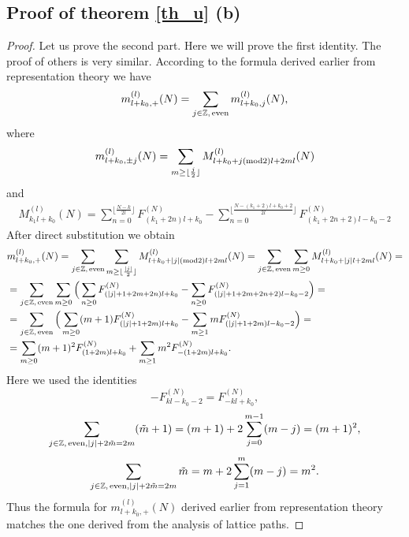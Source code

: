 \documentclass[11pt]{amsart}
\begin{document}
\subsection{Proof of theorem \ref{th_u} (b)}
\begin{proof}
Let us prove the second part. Here we will prove the first identity. 
The proof of others is very similar. According to the formula derived earlier 
from representation theory we have 
\begin{equation*}
m^{(l)}_{l+k_0,+}(N)  = \sum_{j \in \mathbb{Z},\, {\rm even} } m^{(l)}_{l+k_0,j}(N),
\end{equation*}
where
\begin{equation*}
m^{(l)}_{l+k_0,\pm j}(N)  = \sum_{m \geq \lfloor \frac{j}{2} \rfloor} M^{(l)}_{l+k_0+ j({\rm mod}2)l + 2ml}(N)
\end{equation*}
and
\begin{eqnarray*}
M_{k_1 l +k_0}^{(l)}(N) =   
\sum\limits_{n=0}^{\lfloor\frac{N-k}{2l}\rfloor  } F_{(k_1+2n)l + k_0}^{(N)}- \sum\limits_{n=0}^{\lfloor\frac{N-(k_1+ 2)l +k_0+2}{2l}\rfloor} F_{(k_1+2n +2)l -k_0-2}^{(N)}
\end{eqnarray*}
After direct substitution we obtain
\begin{eqnarray*}
&m^{(l)}_{l+k_0,+}(N)=\sum\limits_{j \in \mathbb{Z},\, {\rm even} } \sum\limits_{m \geq \lfloor \frac{|j|}{2} \rfloor} M^{(l)}_{l+k_0+ |j|({\rm mod}2)l + 2ml}(N)=\sum\limits_{j \in \mathbb{Z},\, {\rm even} } \sum\limits_{m \geq 0} M^{(l)}_{l+k_0+|j|l+2ml}(N)=\\
&=\sum\limits_{j \in \mathbb{Z},\, {\rm even} } \sum\limits_{m \geq 0}\Big(\sum\limits_{n\geq 0} F_{(|j|+1+2m+2n)l + k_0}^{(N)} 
- \sum\limits_{n\geq 0} F_{(|j|+1+2m+2n+2)l -k_0-2}^{(N)}\Big)=\\
&=\sum\limits_{j \in \mathbb{Z},\, {\rm even} }\Big( \sum\limits_{m \geq 0}(m+1)F_{(|j|+1+2m)l + k_0}^{(N)} 
-  \sum\limits_{m \geq 1} m F_{(|j|+1+2m)l -k_0-2}^{(N)}\Big)=\\
&=\sum\limits_{m \geq 0}(m+1)^2 F_{(1+2m)l + k_0}^{(N)} + \sum\limits_{m \geq 1} m^2 F_{-(1+2m)l+k_0}^{(N)}.
\end{eqnarray*}
Here we used the identities
\begin{equation*}
-F_{kl -k_0-2}^{(N)}=F_{-kl+k_0}^{(N)},
\end{equation*}
\begin{equation*}
\sum_{j \in \mathbb{Z},\, {\rm even}, |j|+2\tilde{m}=2m }(\tilde{m}+1)=(m+1)+2\sum_{j=0}^{m-1}(m-j)=(m+1)^2,
\end{equation*}
\begin{equation*}
\sum_{j \in \mathbb{Z},\, {\rm even}, |j|+2\tilde{m}=2m }\tilde{m}=m+2\sum_{j=1}^{m}(m-j)=m^2.
\end{equation*}
Thus the formula for $m^{(l)}_{l+k_0,+}(N)$ derived earlier from representation theory matches the one derived from the analysis of lattice paths. 
\end{proof}
\end{document}

